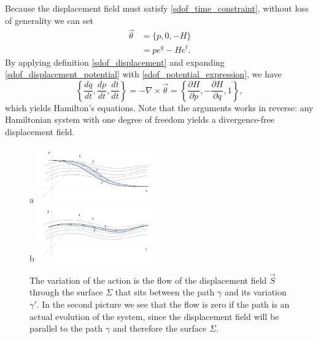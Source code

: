 \documentclass[10pt,twocolumn, nofootinbib]{revtex4-2}
\begin{document}
Because the displacement field must satisfy \ref{sdof_time_constraint}, without loss of generality we can set
\begin{equation}\label{sdof_potential_expression}
\begin{aligned}
	\vec{\theta} &= \{p, 0, -H\} \\
	&= p e^q - H e^t.
\end{aligned}
\end{equation}
By applying definition \ref{sdof_displacement} and expanding \ref{sdof_displacement_potential} with \ref{sdof_potential_expression}, we have
\begin{equation}\label{sdof_Ham_eq}
	\left\{ \frac{dq}{dt},\frac{dp}{dt},\frac{dt}{dt} \right\} = - \nabla \times \vec{\theta} = \left\{ \frac{\partial H}{\partial p},-\frac{\partial H}{\partial q}, 1 \right\},
\end{equation}
which yields Hamilton's equations. Note that the arguments works in reverse: any Hamiltonian system with one degree of freedom yields a divergence-free displacement field.

\begin{figure}
	a \includegraphics[width = 0.45\textwidth]{ActionNonOptimized.png} \\
	b \includegraphics[width = 0.45\textwidth]{ActionOptimized.png}
	\caption{\footnotesize{The variation of the action is the flow of the displacement field $\vec{S}$ through the surface $\Sigma$ that sits between the path $\gamma$ and its variation $\gamma'$. In the second picture we see that the flow is zero if the path is an actual evolution of the system, since the displacement field will be parallel to the path $\gamma$ and therefore the surface $\Sigma$.}}\label{fig_action}
\end{figure}
\end{document}
